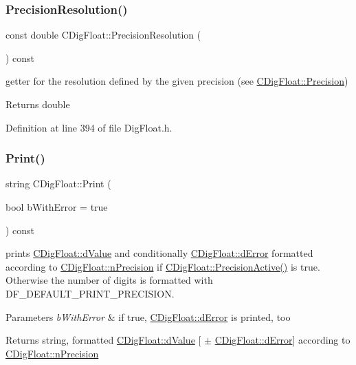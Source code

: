 \subsubsection{\texorpdfstring{Precision\+Resolution()}{PrecisionResolution()}}
{\footnotesize\ttfamily const double C\+Dig\+Float\+::\+Precision\+Resolution (\begin{DoxyParamCaption}{ }\end{DoxyParamCaption}) const\hspace{0.3cm}{\ttfamily [inline]}}



getter for the resolution defined by the given precision (see \hyperlink{classCDigFloat_a95875f6f7246debee0d00b0c41c82aee}{C\+Dig\+Float\+::\+Precision}) 

\begin{DoxyReturn}{Returns}
double 
\end{DoxyReturn}


Definition at line 394 of file Dig\+Float.\+h.

\mbox{\label{classCDigFloat_a80731e0970f607114d6d1bde4d02bd39}} 
\subsubsection{\texorpdfstring{Print()}{Print()}}
{\footnotesize\ttfamily string C\+Dig\+Float\+::\+Print (\begin{DoxyParamCaption}\item[{bool}]{b\+With\+Error = {\ttfamily true} }\end{DoxyParamCaption}) const}



prints \hyperlink{classCDigFloat_a4bbe69e30dd4e20527362493aa9aaf96}{C\+Dig\+Float\+::d\+Value} and conditionally \hyperlink{classCDigFloat_a25eb3782d1e727ff007a48f8308e3d4d}{C\+Dig\+Float\+::d\+Error} formatted according to \hyperlink{classCDigFloat_ad580654be35246d14c91482581c0bc11}{C\+Dig\+Float\+::n\+Precision} if \hyperlink{classCDigFloat_a4d6ca24beda280be719374c2a6b2c64d}{C\+Dig\+Float\+::\+Precision\+Active()} is true. Otherwise the number of digits is formatted with D\+F\+\_\+\+D\+E\+F\+A\+U\+L\+T\+\_\+\+P\+R\+I\+N\+T\+\_\+\+P\+R\+E\+C\+I\+S\+I\+ON. 


\begin{DoxyParams}{Parameters}
{\em b\+With\+Error} & if true, \hyperlink{classCDigFloat_a25eb3782d1e727ff007a48f8308e3d4d}{C\+Dig\+Float\+::d\+Error} is printed, too \\
\hline
\end{DoxyParams}
\begin{DoxyReturn}{Returns}
string, formatted \hyperlink{classCDigFloat_a4bbe69e30dd4e20527362493aa9aaf96}{C\+Dig\+Float\+::d\+Value} \mbox{[} $\pm$ \hyperlink{classCDigFloat_a25eb3782d1e727ff007a48f8308e3d4d}{C\+Dig\+Float\+::d\+Error}\mbox{]} according to \hyperlink{classCDigFloat_ad580654be35246d14c91482581c0bc11}{C\+Dig\+Float\+::n\+Precision} 
\end{DoxyReturn}



